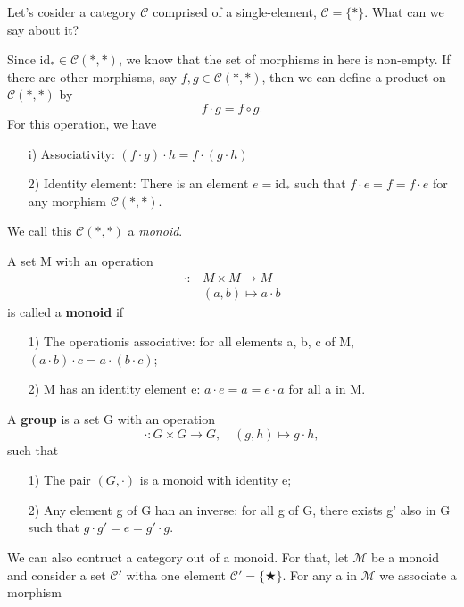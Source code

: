 \documentclass[../category_theory.tex]{subfiles}
\begin{document}
\begin{example}
	Let's cosider a category \(\mathcal{C}\) comprised of a single-element, \(\mathcal{C}=\{*\}\). What can we say about it?

	Since \(\mathrm{id}_{*}\in \mathcal{C}(*, *)\), we know that the set of morphisms in here is non-empty. If there are other morphisms, say \(f, g\in \mathcal{C}(*, *)\), then we can define a product on \(\mathcal{C}(*, *)\) by
	\[
		f \cdot g=f\circ g.
	\]
	For this operation, we have
	\begin{itemize}
		\item[i)] Associativity: \((f \cdot g )\cdot h = f \cdot (g \cdot h)\)
		\item[2)] Identity element: There is an element \(e=\mathrm{id}_{*}\) such that \(f \cdot e = f = f \cdot e\) for any morphism \(\mathcal{C}(*, *)\).
	\end{itemize}
	We call this \(\mathcal{C}(*, *)\) a \textit{monoid}.
\end{example}
\begin{def*}
	A set M with an operation
	\begin{align*}
		\cdot : & M \times M\rightarrow M \\
		        & (a, b)\mapsto a \cdot b
	\end{align*}
	is called a \textbf{monoid} if
	\begin{itemize}
		\item[1)] The operationis associative: for all elements a, b, c of M, \((a \cdot b)\cdot c=a \cdot (b \cdot c)\);
		\item[2)] M has an identity element e: \(a \cdot e = a = e \cdot a\) for all a in M.
	\end{itemize}
\end{def*}
\begin{def*}
	A \textbf{group} is a set G with an operation
	\[
		\cdot :G \times G\rightarrow G, \quad (g, h)\mapsto g \cdot h,
	\]
	such that
	\begin{itemize}
		\item[1)] The pair \((G, \cdot )\) is a monoid with identity e;
		\item[2)] Any element g of G han an inverse: for all g of G, there exists g' also in G such that \(g \cdot g' = e = g' \cdot g.\)
	\end{itemize}
\end{def*}
We can also contruct a category out of a monoid. For that, let \(\mathcal{M}\) be a monoid and consider a set \(\mathcal{C}'\) witha one element \(\mathcal{C}' = \{\bigstar\}\). For any a in \(\mathcal{M}\) we associate a morphism
\end{document}
